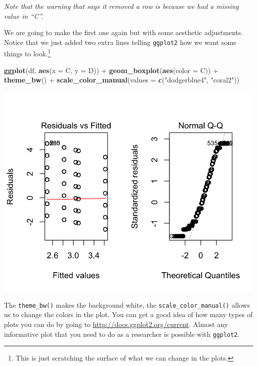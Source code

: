 \documentclass[]{tufte-book}
\newenvironment{Shaded}{}{}
\newcommand{\KeywordTok}[1]{\textcolor[rgb]{0.00,0.44,0.13}{\textbf{#1}}}
\newcommand{\DataTypeTok}[1]{\textcolor[rgb]{0.56,0.13,0.00}{#1}}
\newcommand{\StringTok}[1]{\textcolor[rgb]{0.25,0.44,0.63}{#1}}
\newcommand{\OperatorTok}[1]{\textcolor[rgb]{0.40,0.40,0.40}{#1}}
\newcommand{\NormalTok}[1]{#1}
\theoremstyle{definition}
\theoremstyle{definition}
\theoremstyle{remark}
\begin{document}
\emph{Note that the warning that says it removed a row is because we had
a missing value in ``C''.}

We are going to make the first one again but with some aesthetic
adjustments. Notice that we just added two extra lines telling
\texttt{ggplot2} how we want some things to look.\footnote{This is just
  scratching the surface of what we can change in the plots.}

\begin{Shaded}
\begin{Highlighting}[]
\KeywordTok{ggplot}\NormalTok{(df, }\KeywordTok{aes}\NormalTok{(}\DataTypeTok{x =}\NormalTok{ C, }\DataTypeTok{y =}\NormalTok{ D)) }\OperatorTok{+}\StringTok{ }\KeywordTok{geom_boxplot}\NormalTok{(}\KeywordTok{aes}\NormalTok{(}\DataTypeTok{color =}\NormalTok{ C)) }\OperatorTok{+}\StringTok{ }
\StringTok{    }\KeywordTok{theme_bw}\NormalTok{() }\OperatorTok{+}\StringTok{ }\KeywordTok{scale_color_manual}\NormalTok{(}\DataTypeTok{values =} \KeywordTok{c}\NormalTok{(}\StringTok{"dodgerblue4"}\NormalTok{, }
    \StringTok{"coral2"}\NormalTok{))}
\end{Highlighting}
\end{Shaded}

\includegraphics{_main_files/figure-latex/unnamed-chunk-65-1}

The \texttt{theme\_bw()} makes the background white, the
\texttt{scale\_color\_manual()} allows us to change the colors in the
plot. You can get a good idea of how many types of plots you can do by
going to
\href{http://docs.ggplot2.org/current/}{http://docs.ggplot2.org/current}.
Almost any informative plot that you need to do as a researcher is
possible with \texttt{ggplot2}.
\end{document}
